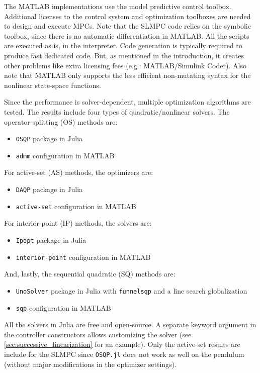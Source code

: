 The MATLAB implementations use the model predictive control toolbox. Additional licenses to the control system and optimization toolboxes are needed to design and execute MPCs. Note that the SLMPC code relies on the symbolic toolbox, since there is no automatic differentiation in MATLAB. All the scripts are executed as is, in the interpreter. Code generation is typically required to produce fast dedicated code. But, as mentioned in the introduction, it creates other problems like extra licensing fees (e.g.: MATLAB/Simulink Coder). Also note that MATLAB only supports the less efficient non-mutating syntax for the nonlinear state-space functions.

Since the performance is solver-dependent, multiple optimization algorithms are tested. The results include four types of quadratic/nonlinear solvers. The operator-splitting (OS) methods are: 
\begin{itemize}
    \item \texttt{OSQP} package in Julia \citep{osqp}
    \item \texttt{admm} configuration in MATLAB \citep{admm}
\end{itemize}
For active-set (AS) methods, the optimizers are: 
\begin{itemize}
    \item \texttt{DAQP} package in Julia \citep{daqp}
    \item \texttt{active-set} configuration in MATLAB \citep{activeset}
\end{itemize}
For interior-point (IP) methods, the solvers are: 
\begin{itemize}
    \item \texttt{Ipopt} package in Julia \citep{ipopt}
    \item \texttt{interior-point} configuration in MATLAB \citep{interiorpoint}
\end{itemize}
And, lastly, the sequential quadratic (SQ) methods are:
\begin{itemize}
    \item \texttt{UnoSolver} package in Julia with \texttt{funnelsqp} and a line search globalization \citep{uno}
    \item \texttt{sqp} configuration in MATLAB \citep{sqp}
\end{itemize}

All the solvers in Julia are free and open-source. A separate keyword argument in the controller constructors allows customizing the solver (see \cref{sec:successive_linearization} for an example). Only the active-set results are include for the SLMPC since \texttt{OSQP.jl} does not work as well on the pendulum (without major modifications in the optimizer settings).

